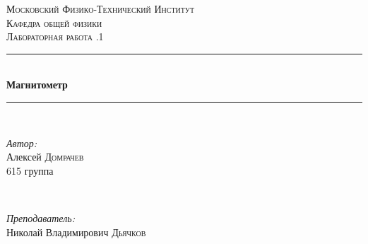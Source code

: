\documentclass[a4paper, 12pt]{article}
\begin{document}
	\begin{titlepage}
		
		\newcommand{\HRule}{\rule{\linewidth}{0.5mm}} %
		
		\center %
		
		
		\textsc{\LARGE Московский Физико-Технический Институт}\\[1,5cm] %
		\textsc{\Large Кафедра общей физики}\\[0.5cm] %
		\textsc{\large Лабораторная работа .1}\\[0.5cm] %
		
		
		\HRule
		\\[0.4cm]
		{ \huge \bfseries Магнитометр}
		\\[0.2cm] %
		\HRule
		\\[1.5cm]
		
		
		
		
		\begin{minipage}{0.4\textwidth}
			\begin{flushleft} \large
				\emph{Автор:}\\
				Алексей \textsc{Домрачев} \\
				615 группа
			\end{flushleft}
		\end{minipage}
		~
		\begin{minipage}{0.4\textwidth}
			\begin{flushright} \large
				\emph{Преподаватель:} \\
				Николай Владимирович \textsc{Дьячков} %
			\end{flushright}
		\end{minipage}
		

\end{titlepage}
\end{document}
